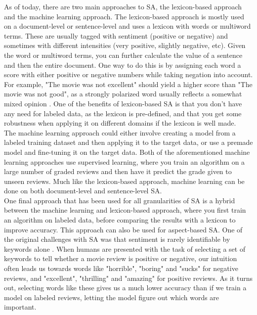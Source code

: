 \documentclass{report}
\begin{document}
As of today, there are two main approaches to SA, the lexicon-based approach and the machine learning approach. The lexicon-based approach is mostly used on a document-level or sentence-level and uses a lexicon with words or multiword terms. These are usually tagged with sentiment (positive or negative) and sometimes with different intensities (very positive, slightly negative, etc). Given the word or multiword terms, you can further calculate the value of a sentence and then the entire document. One way to do this is by assigning each word a score with either positive or negative numbers while taking negation into account. For example, "The movie was not excellent" should yield a higher score than "The movie was not good", as a strongly polarized word usually reflects a somewhat mixed opinion \cite{taboada-etal-2011-lexicon}. One of the benefits of lexicon-based SA is that you don't have any need for labeled data, as the lexicon is pre-defined, and that you get some robustness when applying it on different domains if the lexicon is well made.\\
The machine learning approach could either involve creating a model from a labeled training dataset and then applying it to the target data, or use a premade model and fine-tuning it on the target data. Both of the aforementioned machine learning approaches use supervised learning, where you train an algorithm on a large number of graded reviews and then have it predict the grade given to unseen reviews. Much like the lexicon-based approach, machine learning can be done on both document-level and sentence-level SA.\\
One final approach that has been used for all granularities of SA is a hybrid between the machine learning and lexicon-based approach, where you first train an algorithm on labeled data, before comparing the results with a lexicon to improve accuracy. This approach can also be used for aspect-based SA.
One of the original challenges with SA was that sentiment is rarely identifiable by keywords alone \cite{pang-etal-2002-thumbs}. When humans are presented with the task of selecting a set of keywords to tell whether a movie review is positive or negative, our intuition often leads us towards words like "horrible", "boring" and "sucks" for negative reviews, and "excellent", "thrilling" and "amazing" for positive reviews. As it turns out, selecting words like these gives us a much lower accuracy than if we train a model on labeled reviews, letting the model figure out which words are important. 
\end{document}

